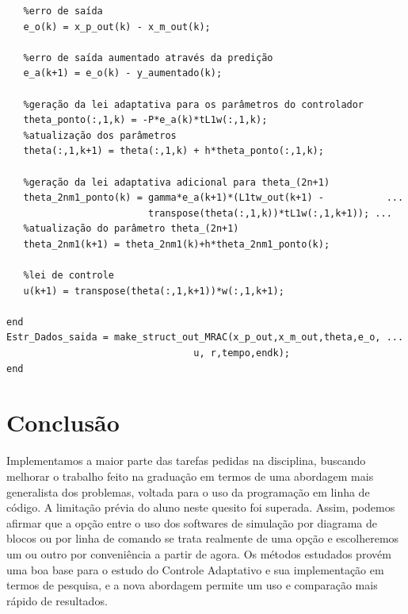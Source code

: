 \documentclass[11pt]{report}
\begin{document}
\begin{verbatim}
   %erro de saída
   e_o(k) = x_p_out(k) - x_m_out(k);
   
   %erro de saída aumentado através da predição
   e_a(k+1) = e_o(k) - y_aumentado(k);
   
   %geração da lei adaptativa para os parâmetros do controlador
   theta_ponto(:,1,k) = -P*e_a(k)*tL1w(:,1,k);
   %atualização dos parâmetros
   theta(:,1,k+1) = theta(:,1,k) + h*theta_ponto(:,1,k);
   
   %geração da lei adaptativa adicional para theta_(2n+1)
   theta_2nm1_ponto(k) = gamma*e_a(k+1)*(L1tw_out(k+1) -           ...
                         transpose(theta(:,1,k))*tL1w(:,1,k+1)); ...
   %atualização do parâmetro theta_(2n+1)
   theta_2nm1(k+1) = theta_2nm1(k)+h*theta_2nm1_ponto(k);
                
   %lei de controle
   u(k+1) = transpose(theta(:,1,k+1))*w(:,1,k+1);
    
end
Estr_Dados_saida = make_struct_out_MRAC(x_p_out,x_m_out,theta,e_o, ...
                                 u, r,tempo,endk);
end

\end{verbatim}


\chapter*{Conclusão}

Implementamos a maior parte das tarefas pedidas na disciplina, buscando melhorar o trabalho feito na graduação em termos de uma abordagem mais generalista dos problemas, voltada para o uso da programação em linha de código. A limitação prévia do aluno neste quesito foi superada. Assim, podemos afirmar que a opção entre o uso dos softwares de simulação por diagrama de blocos ou por linha de comando se trata realmente de uma opção e escolheremos um ou outro por conveniência a partir de agora. Os métodos estudados provém uma boa base para o estudo do Controle Adaptativo e sua implementação em termos de pesquisa, e a nova abordagem permite um uso e comparação mais rápido de resultados.  
\end{document}
